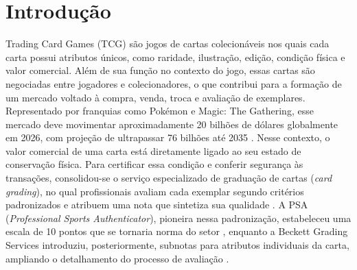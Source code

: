 \documentclass[
    12pt,                %
    openright,           %
    oneside,             %
    a4paper,             %
    english,             %
    brazil               %
]{abntex2}
\begin{document}


\tableofcontents*
\cleardoublepage

\textual

\chapter{Introdução}
\label{cap:introducao}

Trading Card Games (TCG) são jogos de cartas colecionáveis nos quais 
cada carta possui atributos únicos, como raridade, ilustração, edição, 
condição física e valor comercial. Além de sua função no contexto do 
jogo, essas cartas são negociadas entre jogadores e colecionadores, 
o que contribui para a formação de um mercado voltado à compra, venda, 
troca e avaliação de exemplares.
Representado por franquias como Pokémon e Magic: The 
Gathering, esse mercado deve movimentar aproximadamente 20 bilhões de 
dólares globalmente em 2026, com projeção de ultrapassar 76 bilhões 
até 2035 \cite{BRI2026}. Nesse contexto, o valor comercial de uma carta 
está diretamente ligado ao seu estado de conservação física. Para 
certificar essa condição e conferir segurança às transações, 
consolidou-se o serviço especializado de graduação de cartas 
(\textit{card grading}), no qual profissionais avaliam cada exemplar 
segundo critérios padronizados e atribuem uma nota que sintetiza sua 
qualidade \cite{Nahar2025}. A PSA (\textit{Professional Sports 
Authenticator}), pioneira nessa padronização, estabeleceu uma escala 
de 10 pontos que se tornaria norma do setor \cite{Nahar2025}, enquanto 
a Beckett Grading Services introduziu, posteriormente, subnotas para 
atributos individuais da carta, ampliando o detalhamento do processo 
de avaliação \cite{Shen2025}.
\end{document}
